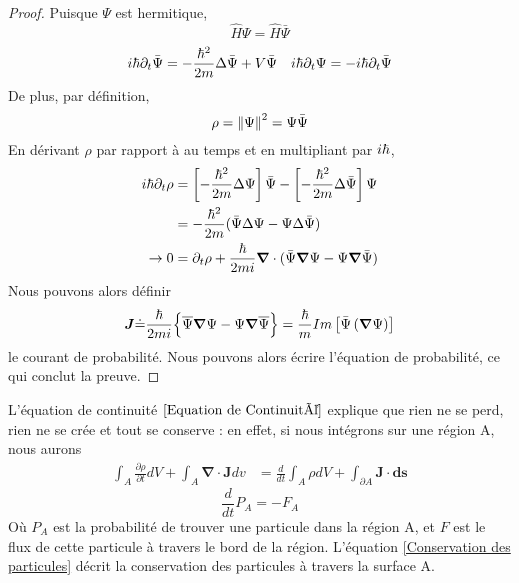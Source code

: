 \documentclass[../notesdecours]{subfiles}
\begin{document}
\begin{proof}
Puisque $\Psi$ est hermitique,
\begin{equation}
\hat{H}\Psi = \hat{H}\bar{\Psi}
\end{equation}
\begin{align}
i\hbar\partial_t\bar{\Psi} &= - \frac{\hbar^2}{2m}\Delta\bar{\Psi}+V\bar{\Psi}	&i\hbar\partial_t\Psi = -i\hbar\partial_t\bar{\Psi}
\end{align}
De plus, par définition,
\begin{equation}
\rho = \norm{\Psi}^2 = \Psi\bar{\Psi}
\end{equation}
En dérivant $\rho$ par rapport à au temps et en multipliant par $i\hbar$,
\begin{align}
i\hbar\partial_t\rho &= \left[-\frac{\hbar^2}{2m}\Delta \Psi\right]\bar{\Psi} - \left[-\frac{\hbar^2}{2m}\Delta\bar{\Psi}\right]\Psi\\
&= -\frac{\hbar^2}{2m} (\bar{\Psi}\Delta\Psi - \Psi\Delta\bar{\Psi})\\
\rightarrow 0 &= \partial_t\rho + \frac{\hbar}{2mi}\bm{\nabla}\cdot(\bar{\Psi}\bm{\nabla}\Psi - \Psi\bm{\nabla}\bar{\Psi})
\end{align}
Nous pouvons alors définir 
\begin{equation}
\bm{J} \dot{=} \frac{\hbar}{2mi} \Big\{\overline{\Psi}\bm{\nabla}\Psi - \Psi\bm{\nabla}\overline{\Psi}\Big\} = \frac{\hbar}{m} Im \left[\bar{\Psi} \left(\bm{\nabla} \Psi\right)\right]
\label{Courant de probabilité}
\end{equation}
le courant de probabilité. Nous pouvons alors écrire l'équation de probabilité, ce qui conclut la preuve.
\end{proof}

L'équation de continuité $\eqref{Equation de Continuité}$ explique que rien ne se perd, rien ne se crée et tout se conserve : en effet, si nous intégrons sur une région A, nous aurons
\begin{align*}
\int_A \frac{\partial \rho}{\partial t} dV + \int_A \bm{\nabla}\cdot\bm{J} dv &= \frac{d}{dt} \int_A \rho dV + \int_{\partial A} \bm{J}\cdot\bm{ds}
\end{align*}
\begin{equation}
\frac{d}{dt} P_A = -F_A
\label{Conservation des particules}
\end{equation}
Où $P_A$ est la probabilité de trouver une particule dans la région A, et $F$ est le flux de cette particule à travers le bord de la région. L'équation \eqref{Conservation des particules} décrit la conservation des particules à travers la surface A.\\
\end{document}
